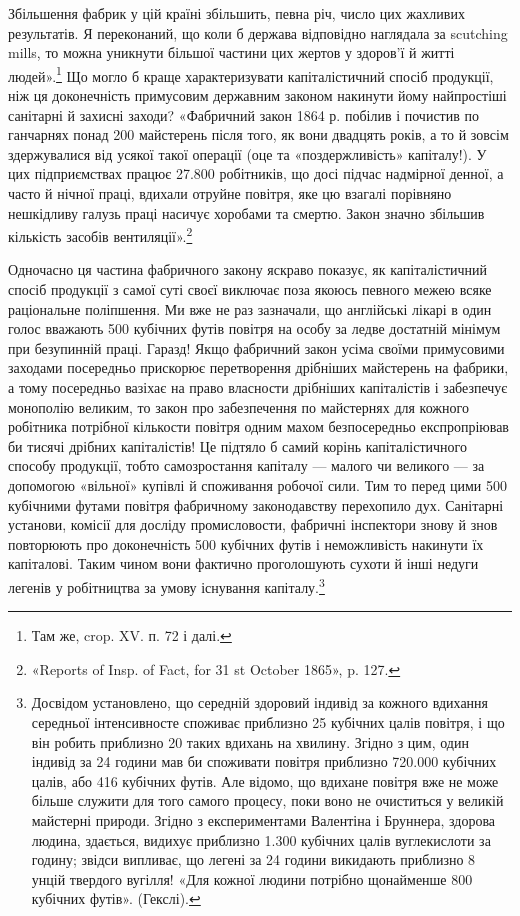\parcont{}  %
Збільшення фабрик у цій країні збільшить, певна річ, число цих
жахливих результатів. Я переконаний, що коли б держава відповідно наглядала за scutching mills, то
можна уникнути більшої частини цих жертов у здоров’ї й житті людей».\footnote{
Там же, crop. XV. п. 72 і далі.
} Що могло б
краще характеризувати капіталістичний спосіб продукції, ніж
ця доконечність примусовим державним законом накинути йому
найпростіші санітарні й захисні заходи? «Фабричний закон 1864 р.
побілив і почистив по ганчарнях понад 200 майстерень після
того, як вони двадцять років, а то й зовсім здержувалися від
усякої такої операції (оце та «поздержливість» капіталу!). У цих
підприємствах працює 27.800 робітників, що досі підчас надмірної денної, а часто й нічної праці,
вдихали отруйне повітря,
яке цю взагалі порівняно нешкідливу галузь праці насичує
хоробами та смертю. Закон значно збільшив кількість засобів
вентиляції».\footnote{
«Reports of Insp. of Fact, for 31 st October 1865», p. 127.
}

Одночасно ця частина фабричного закону яскраво показує, як
капіталістичний спосіб продукції з самої суті своєї виключає
поза якоюсь певного межею всяке раціональне поліпшення. Ми
вже не раз зазначали, що англійські лікарі в один голос вважають
500 кубічних футів повітря на особу за ледве достатній мінімум
при безупинній праці. Гаразд! Якщо фабричний закон усіма
своїми примусовими заходами посередньо прискорює перетворення дрібніших майстерень на фабрики, а
тому посередньо
вазіхає на право власности дрібніших капіталістів і забезпечує
монополію великим, то закон про забезпечення по майстернях
для кожного робітника потрібної кількости повітря одним махом
безпосередньо експропріював би тисячі дрібних капіталістів!
Це підтяло б самий корінь капіталістичного способу продукції,
тобто самозростання капіталу — малого чи великого — за допомогою «вільної» купівлі й споживання
робочої сили. Тим то
перед цими 500 кубічними футами повітря фабричному законодавству перехопило дух. Санітарні установи,
комісії для досліду промисловости, фабричні інспектори знову й знов повторюють про доконечність 500
кубічних футів і неможливість накинути їх капіталові. Таким чином вони фактично проголошують
сухоти й інші недуги легенів у робітництва за умову існування
капіталу.\footnote{
Досвідом установлено, що середній здоровий індивід за кожного
вдихання середньої інтенсивносте споживає приблизно 25 кубічних
цалів  повітря, і що він робить приблизно 20 таких вдихань на хвилину. Згідно з цим, один індивід за
24 години мав би споживати повітря приблизно 720.000 кубічних цалів, або 416 кубічних футів. Але
відомо, що вдихане повітря вже не може більше служити для того самого
процесу, поки воно не очиститься у великій майстерні природи. Згідно
з експериментами Валентіна і Бруннера, здорова людина, здається, видихує приблизно 1.300 кубічних
цалів вуглекислоти за годину; звідси
випливає, що легені за 24 години викидають приблизно 8 унцій твердого
вугілля! «Для кожної людини потрібно щонайменше 800 кубічних
футів». (Гекслі).
}
